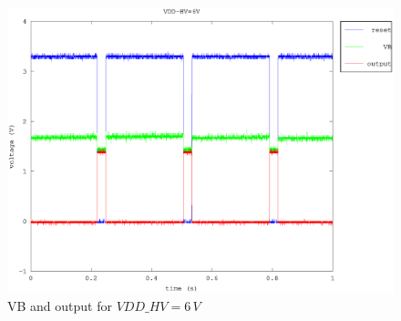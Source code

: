 \documentclass{article}
\begin{document}
\begin{figure}[H]
	\centering
	\includegraphics[width=0.8\linewidth]{fig/VB_6V.eps}
	\caption{VB and output for $VDD\_HV=6\,V$}
	\label{fig:VB_6V}
\end{figure}
\end{document}
